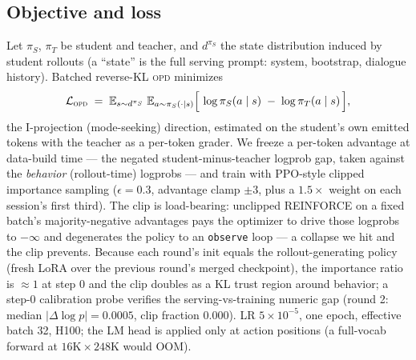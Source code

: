 \documentclass[11pt]{article}
\newcommand{\opd}{\textsc{opd}}
\begin{document}
\subsection{Objective and loss}
Let $\pi_S$, $\pi_T$ be student and teacher, and $d^{\pi_S}$ the state distribution induced by
student rollouts (a ``state'' is the full serving prompt: system, bootstrap, dialogue history).
Batched reverse-KL \opd{} minimizes
\begin{equation}
\mathcal{L}_{\textsc{opd}}
 \;=\; \mathbb{E}_{s \sim d^{\pi_S}}\;
 \mathbb{E}_{a \sim \pi_S(\cdot \mid s)}
 \Big[\, \log \pi_S(a \mid s) \;-\; \log \pi_T(a \mid s) \,\Big],
\label{eq:opd}
\end{equation}
the I-projection (mode-seeking) direction, estimated on the student's own emitted tokens with the
teacher as a per-token grader. We freeze a per-token advantage at data-build time --- the negated
student-minus-teacher logprob gap, taken against the \emph{behavior} (rollout-time) logprobs ---
and train with PPO-style clipped importance sampling ($\epsilon{=}0.3$, advantage clamp $\pm 3$,
plus a $1.5\times$ weight on each session's first third). The clip is load-bearing: unclipped
REINFORCE on a fixed batch's majority-negative advantages pays the optimizer to drive those
logprobs to $-\infty$ and degenerates the policy to an \texttt{observe} loop --- a collapse we
hit and the clip prevents. Because each round's init equals the rollout-generating policy
(fresh LoRA over the previous round's merged checkpoint), the importance ratio is $\approx 1$ at
step 0 and the clip doubles as a KL trust region around behavior; a step-0 calibration probe
verifies the serving-vs-training numeric gap (round 2: median $|{\Delta}\log p| = 0.0005$, clip
fraction $0.000$). LR $5\times10^{-5}$, one epoch, effective batch 32, H100; the LM head is
applied only at action positions (a full-vocab forward at $16\mathrm{K}\times 248\mathrm{K}$
would OOM).
\end{document}

